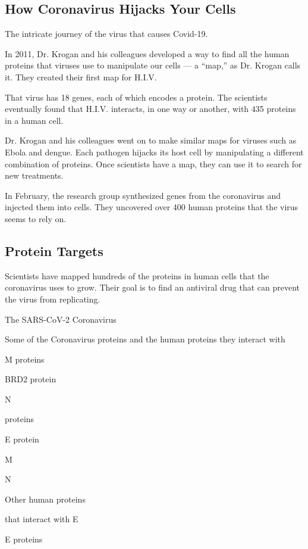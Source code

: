 \hypertarget{how-coronavirus-hijacks-your-cells}{%
\subsection{How Coronavirus Hijacks Your
Cells}\label{how-coronavirus-hijacks-your-cells}}

The intricate journey of the virus that causes Covid-19.

In 2011, Dr. Krogan and his colleagues developed a way to find all the
human proteins that viruses use to manipulate our cells --- a ``map,''
as Dr. Krogan calls it. They created their first map for H.I.V.

That virus has 18 genes, each of which encodes a protein. The scientists
eventually found that H.I.V. interacts, in one way or another, with 435
proteins in a human cell.

Dr. Krogan and his colleagues went on to make similar maps for viruses
such as Ebola and dengue. Each pathogen hijacks its host cell by
manipulating a different combination of proteins. Once scientists have a
map, they can use it to search for new treatments.

In February, the research group synthesized genes from the coronavirus
and injected them into cells. They uncovered over 400 human proteins
that the virus seems to rely on.

\hypertarget{protein-targets}{%
\subsection{Protein Targets}\label{protein-targets}}

Scientists have mapped hundreds of the proteins in human cells that the
coronavirus uses to grow. Their goal is to find an antiviral drug that
can prevent the virus from replicating.

The SARS-CoV-2 Coronavirus

Some of the Coronavirus proteins and the human proteins they interact
with

M proteins

BRD2 protein

N

proteins

E protein

M

N

Other human proteins

that interact with E

E proteins

